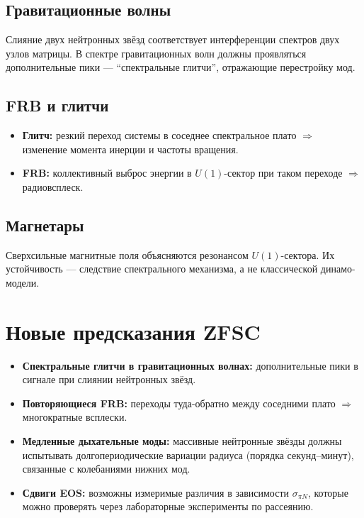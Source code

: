 \documentclass[a4paper,12pt]{article}
\begin{document}
\subsection*{Гравитационные волны}
Слияние двух нейтронных звёзд соответствует интерференции спектров двух узлов матрицы. В спектре гравитационных волн должны проявляться дополнительные пики --- ``спектральные глитчи'', отражающие перестройку мод.

\subsection*{FRB и глитчи}
\begin{itemize}
  \item \textbf{Глитч:} резкий переход системы в соседнее спектральное плато $\Rightarrow$ изменение момента инерции и частоты вращения.
  \item \textbf{FRB:} коллективный выброс энергии в $U(1)$-сектор при таком переходе $\Rightarrow$ радиовсплеск.
\end{itemize}

\subsection*{Магнетары}
Сверхсильные магнитные поля объясняются резонансом $U(1)$-сектора. Их устойчивость --- следствие спектрального механизма, а не классической динамо-модели.

\section*{Новые предсказания ZFSC}

\begin{itemize}
  \item \textbf{Спектральные глитчи в гравитационных волнах:} дополнительные пики в сигнале при слиянии нейтронных звёзд.
  \item \textbf{Повторяющиеся FRB:} переходы туда-обратно между соседними плато $\Rightarrow$ многократные всплески.
  \item \textbf{Медленные дыхательные моды:} массивные нейтронные звёзды должны испытывать долгопериодические вариации радиуса (порядка секунд--минут), связанные с колебаниями нижних мод.
  \item \textbf{Сдвиги EOS:} возможны измеримые различия в зависимости $\sigma_{\pi N}$, которые можно проверять через лабораторные эксперименты по рассеянию.
\end{itemize}
\end{document}
